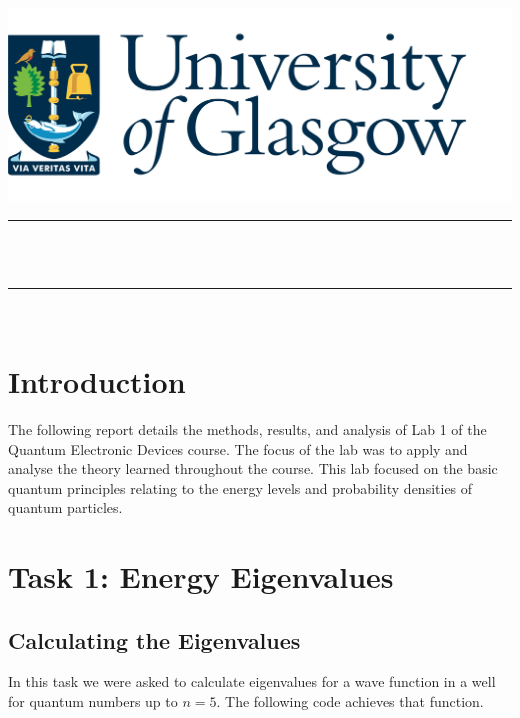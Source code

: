 \documentclass[a4paper,12pt]{article}
\makeatletter
\def\maketitle{
  \begin{center}\leavevmode
       \normalfont
       \includegraphics[width=1\columnwidth]{UoG Logo Transparent BG.png}
       \vskip 1.5cm   
       \textsc{\large \department}\\
       \vskip 1.5cm
       \rule{\linewidth}{0.3 mm} \\
       \vskip 0.5cm
       {\large \course}\\[1 cm]
       {\huge \bfseries \@title \par}
       \vspace{0.7cm}
	\rule{\linewidth}{0.2 mm} \\[1.5 cm]
	
    \textbf{\large \@author}
	\vskip 0.5cm
	\textbf{\studentID}	
	

	\vfill
	{\Large \@date\par}
   \end{center}
   \cleardoublepage
  }
\makeatother
\begin{document}

\maketitle

\clearpage
\tableofcontents
\clearpage



\section{Introduction}
The following report details the methods, results, and analysis of Lab 1 of the Quantum Electronic Devices course. The focus of the lab was to apply and analyse the theory learned throughout the course. This lab focused on the basic quantum principles relating to the energy levels and probability densities of quantum particles.

\section{Task 1: Energy Eigenvalues}
\subsection{Calculating the Eigenvalues}
In this task we were asked to calculate eigenvalues for a wave function in a well for quantum numbers up to \(n = 5\). The following code achieves that function.
\end{document}
